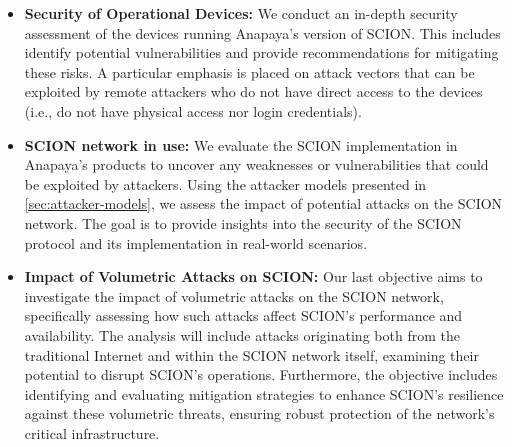 \begin{itemize}
        \item \textbf{Security of Operational Devices:}
        We conduct an in-depth security assessment of the devices running Anapaya's version of SCION.
        This includes identify potential vulnerabilities and provide recommendations for mitigating these risks.
        A particular emphasis is placed on attack vectors that can be exploited by remote attackers who do not have direct access to the devices (i.e., do not have physical access nor login credentials).

        \item \textbf{SCION network in use:}
        We evaluate the SCION implementation in Anapaya's products to uncover any weaknesses or vulnerabilities that could be exploited by attackers.
        Using the attacker models presented in \cref{sec:attacker-models}, we assess the impact of potential attacks on the SCION network.
        The goal is to provide insights into the security of the SCION protocol and its implementation in real-world scenarios.

        \item \textbf{Impact of Volumetric Attacks on SCION:}
        Our last objective aims to investigate the impact of volumetric attacks on the SCION network, specifically assessing how such attacks affect SCION's performance and availability.
        The analysis will include attacks originating both from the traditional Internet and within the SCION network itself, examining their potential to disrupt SCION's operations.
        Furthermore, the objective includes identifying and evaluating mitigation strategies to enhance SCION's resilience against these volumetric threats, ensuring robust protection of the network's critical infrastructure.
\end{itemize}



